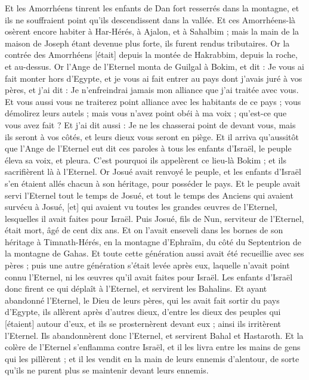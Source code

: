 \begin{multicols}{2}
Et les Amorrhéens tinrent les enfants de Dan fort resserrés dans la montagne, et ils ne souffraient point qu'ils descendissent dans la vallée.
Et ces Amorrhéens-là osèrent encore habiter à Har-Hérés, à Ajalon, et à Sahalbim ; mais la main de la maison de Joseph étant devenue plus forte, ils furent rendus tributaires.
Or la contrée des Amorrhéens [était] depuis la montée de Hakrabbim, depuis la roche, et au-dessus.
\VerseOne{}Or l'Ange de l'Eternel monta de Guilgal à Bokim, et dit : Je vous ai fait monter hors d'Egypte, et je vous ai fait entrer au pays dont j'avais juré à vos pères, et j'ai dit : Je n'enfreindrai jamais mon alliance que j'ai traitée avec vous.
Et vous aussi vous ne traiterez point alliance avec les habitants de ce pays ; vous démolirez leurs autels ; mais vous n'avez point obéi à ma voix ; qu'est-ce que vous avez fait ?
Et j'ai dit aussi : Je ne les chasserai point de devant vous, mais ils seront à vos côtés, et leurs dieux vous seront en piège.
Et il arriva qu'aussitôt que l'Ange de l'Eternel eut dit ces paroles à tous les enfants d'Israël, le peuple éleva sa voix, et pleura.
C'est pourquoi ils appelèrent ce lieu-là Bokim ; et ils sacrifièrent là à l'Eternel.
Or Josué avait renvoyé le peuple, et les enfants d'Israël s'en étaient allés chacun à son héritage, pour posséder le pays.
Et le peuple avait servi l'Eternel tout le temps de Josué, et tout le temps des Anciens qui avaient survécu à Josué, [et] qui avaient vu toutes les grandes œuvres de l'Eternel, lesquelles il avait faites pour Israël.
Puis Josué, fils de Nun, serviteur de l'Eternel, était mort, âgé de cent dix ans.
Et on l'avait enseveli dans les bornes de son héritage à Timnath-Hérés, en la montagne d'Ephraïm, du côté du Septentrion de la montagne de Gahas.
Et toute cette génération aussi avait été recueillie avec ses pères ; puis une autre génération s'était levée après eux, laquelle n'avait point connu l'Eternel, ni les œuvres qu'il avait faites pour Israël.
Les enfants d'Israël donc firent ce qui déplaît à l'Eternel, et servirent les Bahalins.
Et ayant abandonné l'Eternel, le Dieu de leurs pères, qui les avait fait sortir du pays d'Egypte, ils allèrent après d'autres dieux, d'entre les dieux des peuples qui [étaient] autour d'eux, et ils se prosternèrent devant eux ; ainsi ils irritèrent l'Eternel.
Ils abandonnèrent donc l'Eternel, et servirent Bahal et Hastaroth.
Et la colère de l'Eternel s'enflamma contre Israël, et il les livra entre les mains de gens qui les pillèrent ; et il les vendit en la main de leurs ennemis d'alentour, de sorte qu'ils ne purent plus se maintenir devant leurs ennemis.

\end{multicols}
